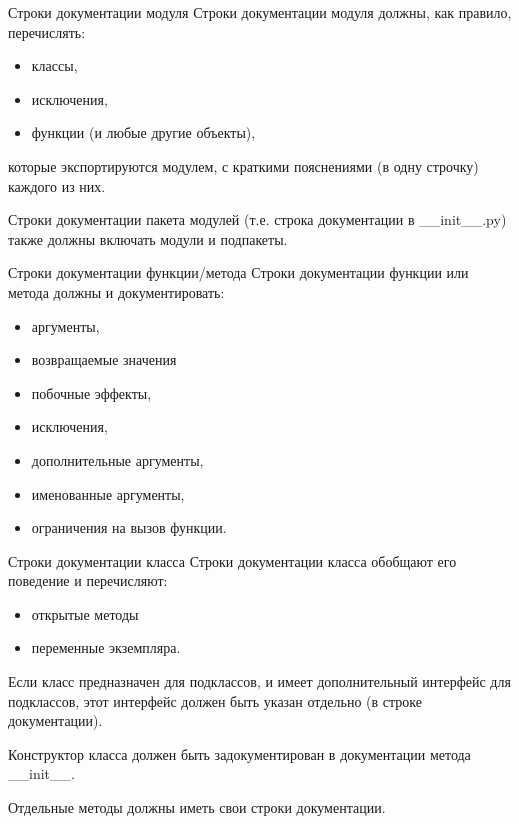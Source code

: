 \documentclass[xcolor=table]{beamer}
\begin{document}
\begin{frame}[fragile]{Строки документации модуля}
	Строки документации модуля должны, как правило, перечислять:
	\begin{itemize}
		\item классы, 
		\item исключения,
		\item функции (и любые другие объекты), 
	\end{itemize}	
	которые экспортируются модулем, с краткими пояснениями (в одну строчку) каждого из них. 
	
	\medskip
	
	Строки документации пакета модулей (т.е. строка документации в \_\_init\_\_.py) также должны включать модули и подпакеты.
\end{frame}

\begin{frame}[fragile]{Строки документации функции/метода}
	Строки документации функции или метода должны и документировать:
	\begin{itemize}
		\item аргументы, 
		\item возвращаемые значения
		\item побочные эффекты, 
		\item исключения, 
		\item дополнительные аргументы, 
		\item именованные аргументы, 
		\item ограничения на вызов функции.
	\end{itemize}
\end{frame}

\begin{frame}[fragile]{Строки документации класса}
	Строки документации класса обобщают его поведение и перечисляют:
	\begin{itemize}
		\item открытые методы 
		\item переменные экземпляра.
	\end{itemize}
	Если класс предназначен для подклассов, и имеет дополнительный интерфейс для подклассов, этот интерфейс должен быть указан отдельно (в строке документации). 

	\medskip

	Конструктор класса должен быть задокументирован в документации метода \_\_init\_\_. 
	
	\medskip
	
	Отдельные методы должны иметь свои строки документации.	
\end{frame}
\end{document}
